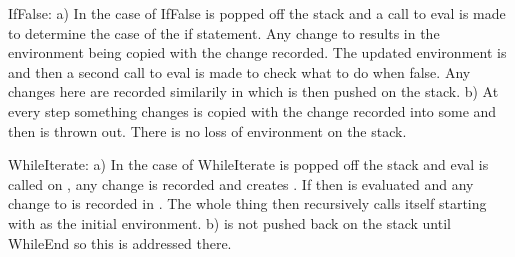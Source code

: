 \documentclass{book}
\begin{document}
\begin{mdP}[class={indent},data-line={153}]%
{}IfFalse: a) In the case of IfFalse %
{}\mdSpan[class={math-inline},elem={math-inline}]{$\rho$}%
{} is popped off the stack and a call to eval is 
made to determine the case of the if statement. Any change to %
{}\mdSpan[class={math-inline},elem={math-inline}]{$\rho$}%
{} results in the 
environment being copied with the change recorded. The updated environment is %
{}\mdSpan[class={math-inline},elem={math-inline}]{$\rho \prime$}%
{} and then a second call to eval is made to check what to do when false. Any 
changes here are recorded similarily in %
{}\mdSpan[class={math-inline},elem={math-inline}]{$\rho \prime \prime$}%
{} which is then pushed on 
the stack. b) At every step something changes %
{}\mdSpan[class={math-inline},elem={math-inline}]{$\rho$}%
{} is copied with the change recorded 
into some %
{}\mdSpan[class={math-inline},elem={math-inline}]{$\rho \prime$}%
{} and then %
{}\mdSpan[class={math-inline},elem={math-inline}]{$\rho$}%
{} is thrown out. There is no loss of environment 
on the stack.                                                                         %
{} %
{}%
\end{mdP}%
\begin{mdP}[class={indent},data-line={162}]%
{}WhileIterate: a) In the case of WhileIterate %
{}\mdSpan[class={math-inline},elem={math-inline}]{$\rho$}%
{} is popped off the stack and eval is 
called on %
{}%
{}, any change is recorded and creates %
{}\mdSpan[class={math-inline},elem={math-inline}]{$\rho \prime$}%
{}. If %
{}%
{} then 
{}%
{} is evaluated and any change to %
{}\mdSpan[class={math-inline},elem={math-inline}]{$\rho \prime$}%
{} is recorded in %
{}\mdSpan[class={math-inline},elem={math-inline}]{$\rho \prime \prime$}%
{}. 
The whole thing then recursively calls itself starting with %
{}\mdSpan[class={math-inline},elem={math-inline}]{$\rho \prime \prime$}%
{} as the 
initial environment. b) %
{}\mdSpan[class={math-inline},elem={math-inline}]{$\rho \prime$}%
{} is not pushed back on the stack until WhileEnd so 
this is addressed there.%
\end{mdP}%
\end{document}
